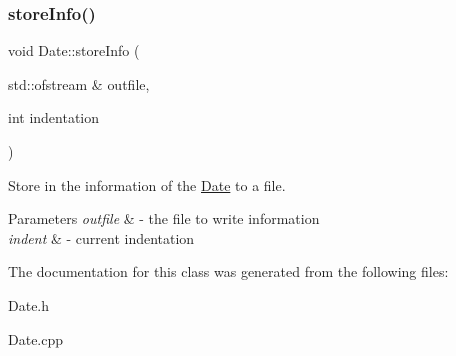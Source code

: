 \subsubsection{\texorpdfstring{store\+Info()}{storeInfo()}}
{\footnotesize\ttfamily void Date\+::store\+Info (\begin{DoxyParamCaption}\item[{std\+::ofstream \&}]{outfile,  }\item[{int}]{indentation }\end{DoxyParamCaption})}



Store in the information of the \mbox{\hyperlink{class_date}{Date}} to a file. 


\begin{DoxyParams}{Parameters}
{\em outfile} & -\/ the file to write information \\
\hline
{\em indent} & -\/ current indentation \\
\hline
\end{DoxyParams}


The documentation for this class was generated from the following files\+:\begin{DoxyCompactItemize}
\item 
Date.\+h\item 
Date.\+cpp\end{DoxyCompactItemize}
